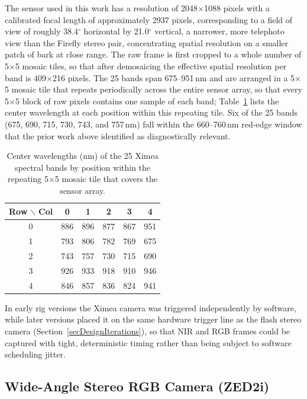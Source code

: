 The sensor used in this work has a resolution of
2048$\times$1088 pixels with a calibrated focal length of
approximately 2937 pixels, corresponding to a field of view of
roughly 38.4$^\circ$ horizontal by 21.0$^\circ$
vertical, a narrower, more telephoto view than the Firefly
stereo pair, concentrating spatial resolution on a smaller patch
of bark at close range.
The raw frame is first cropped to a whole number of 5$\times$5 mosaic
tiles, so that after demosaicing the effective spatial resolution per
band is 409$\times$216 pixels.
The 25 bands span 675--951\,nm and are arranged in a 5$\times$5
mosaic tile that repeats periodically across the entire sensor
array, so that every 5$\times$5 block of raw pixels contains one
sample of each band; Table~\ref{tabXimeaBands} lists the center
wavelength at each position within this repeating tile.
Six of the 25 bands (675, 690, 715, 730, 743, and
757\,nm) fall within the 660--760\,nm red-edge window that the prior work
above identified as diagnostically relevant.

\begin{table}[h]
    \centering
    \caption{Center wavelengths (nm) of the 25 Ximea spectral
             bands by position within the repeating
             5$\times$5 mosaic tile that covers the sensor array.}
    \label{tabXimeaBands}
    \begin{tabular}{c|ccccc}
        \hline
        Row $\backslash$ Col & 0 & 1 & 2 & 3 & 4 \\
        \hline
        0 & 886 & 896 & 877 & 867 & 951 \\
        1 & 793 & 806 & 782 & 769 & 675 \\
        2 & 743 & 757 & 730 & 715 & 690 \\
        3 & 926 & 933 & 918 & 910 & 946 \\
        4 & 846 & 857 & 836 & 824 & 941 \\
        \hline
    \end{tabular}
\end{table}

In early rig versions the Ximea camera was triggered
independently by software, while later versions placed it on the
same hardware trigger line as the flash stereo camera
(Section~\ref{secDesignIterations}), so that NIR and RGB frames
could be captured with tight, deterministic timing rather than
being subject to software scheduling jitter.

\subsection{Wide-Angle Stereo RGB Camera (ZED2i)} \label{secZED2i}


